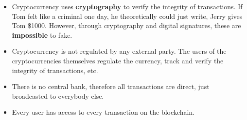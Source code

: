 \documentclass[../main.tex]{subfiles}
\begin{document}
\begin{itemize}
    \item Cryptocurrency uses \textbf{cryptography} to verify the integrity of transactions. If Tom felt like a criminal one day, he theoretically could just write, {\ccmono Jerry gives Tom \$1000}. However, through cryptography and digital signatures, these are \textbf{impossible} to fake.
    \item Cryptocurrency is not regulated by any external party. The users of the cryptocurrencies themselves regulate the currency, track and verify the integrity of transactions, etc.
    \item There is no central bank, therefore all transactions are direct, just broadcasted to everybody else.
    \item Every user has access to every transaction on the blockchain.
\end{itemize}
\end{document}
